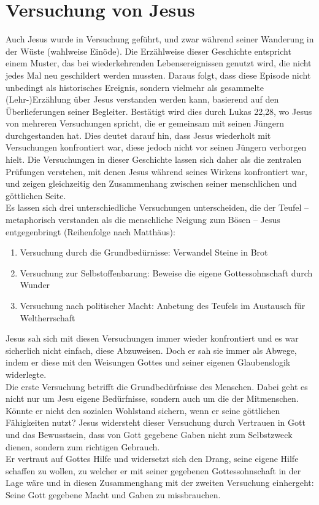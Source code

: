 \section{Versuchung von Jesus}
Auch Jesus wurde in Versuchung geführt, und zwar während seiner Wanderung in der Wüste (wahlweise Einöde). Die Erzählweise dieser Geschichte entspricht einem Muster, das bei wiederkehrenden Lebensereignissen genutzt wird, die nicht jedes Mal neu geschildert werden mussten. Daraus folgt, dass diese Episode nicht unbedingt als historisches Ereignis, sondern vielmehr als gesammelte (Lehr-)Erzählung über Jesus verstanden werden kann, basierend auf den Überlieferungen seiner Begleiter. Bestätigt wird dies durch Lukas 22,28, wo Jesus von mehreren Versuchungen spricht, die er gemeinsam mit seinen Jüngern durchgestanden hat. Dies deutet darauf hin, dass Jesus wiederholt mit Versuchungen konfrontiert war, diese jedoch nicht vor seinen Jüngern verborgen hielt. Die Versuchungen in dieser Geschichte lassen sich daher als die zentralen Prüfungen verstehen, mit denen Jesus während seines Wirkens konfrontiert war, und zeigen gleichzeitig den Zusammenhang zwischen seiner menschlichen und göttlichen Seite.\\

Es lassen sich drei unterschiedliche Versuchungen unterscheiden, die der Teufel – metaphorisch verstanden als die menschliche Neigung zum Bösen – Jesus entgegenbringt (Reihenfolge nach Matthäus):
\begin{enumerate}
    \item Versuchung durch die Grundbedürnisse: Verwandel Steine in Brot
    \item Versuchung zur Selbstoffenbarung: Beweise die eigene Gottessohnschaft durch Wunder
    \item Versuchung nach politischer Macht: Anbetung des Teufels im Austausch für Weltherrschaft
\end{enumerate}
Jesus sah sich mit diesen Versuchungen immer wieder konfrontiert und es war sicherlich nicht einfach, diese Abzuweisen.
Doch er sah sie immer als Abwege, indem er diese mit den Weisungen Gottes und seiner eigenen Glaubenslogik
widerlegte.\\

Die erste Versuchung betrifft die Grundbedürfnisse des Menschen. Dabei geht es nicht nur um Jesu eigene Bedürfnisse, sondern auch um die der Mitmenschen. Könnte er nicht den sozialen Wohlstand sichern, wenn er seine göttlichen Fähigkeiten nutzt? Jesus widersteht dieser Versuchung durch Vertrauen in Gott und das Bewusstsein, dass von Gott gegebene Gaben nicht zum Selbstzweck dienen, sondern zum richtigen Gebrauch.\\ 
Er vertraut auf Gottes Hilfe und widersetzt sich den Drang, seine eigene Hilfe schaffen zu wollen, zu welcher er mit seiner gegebenen Gottessohnschaft in der Lage wäre und in diesen Zusammenghang mit der zweiten Versuchung einhergeht: Seine Gott gegebene Macht und Gaben zu
missbrauchen. \\

